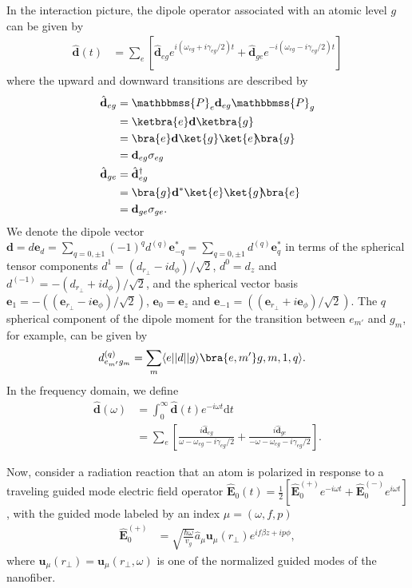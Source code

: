\documentclass[]{report}
\begin{document}
In the interaction picture, the dipole operator associated with an atomic level $ g $ can be given by
\begin{align}\label{eq:dtop}
\hat{\mathbf{d}}(t) &= \sum_e \left[ \hat{\mathbf{d}}_{eg}e^{i(\omega_{eg}+i\gamma_{eg}/2)t} + \hat{\mathbf{d}}_{ge}e^{-i(\omega_{eg}-i\gamma_{eg}/2)t}\right]
\end{align}
where the upward and downward transitions are described by
\begin{align}
\hat{\mathbf{d}}_{eg} &= \mathbbmss{P}_e\mathbf{d}_{eg}\mathbbmss{P}_g\\
&= \ketbra{e} \mathbf{d}\ketbra{g}\\
&= \bra{e} \mathbf{d}\ket{g} \ket{e}\!\!\bra{g}\\
&= \mathbf{d}_{eg} \sigma_{eg}\\
\hat{\mathbf{d}}_{ge} &=\hat{\mathbf{d}}_{eg}^\dagger \\
&= \bra{g} \mathbf{d}^*\ket{e} \ket{g}\!\!\bra{e}\\
&= \mathbf{d}_{ge}\sigma_{ge}.
\end{align}
We denote the dipole vector $ \mathbf{d}=d\mathbf{e}_d=\sum_{q=0,\pm 1} (-1)^qd^{(q)}\mathbf{e}^*_{-q}=\sum_{q=0,\pm 1} d^{(q)}\mathbf{e}^*_{q} $ in terms of the spherical tensor components $ d^1=(d_{r\!_\perp}-id_{\phi})/\sqrt{2} $, $ d^0=d_z $ and $ d^{(-1)} =-(d_{r\!_\perp}+id_{\phi})/\sqrt{2} $, and the spherical vector basis $ \mathbf{e}_1=-((\mathbf{e}_{r\!_\perp}-i\mathbf{e}_{\phi})/\sqrt{2}) $, $ \mathbf{e}_0=\mathbf{e}_z $ and $ \mathbf{e}_{-1}=((\mathbf{e}_{r\!_\perp}+i\mathbf{e}_{\phi})/\sqrt{2}) $. The $ q $ spherical component of the dipole moment for the transition between $ e_{m'} $ and $ g_m $, for example, can be given by
\begin{align}
d^{(q)}_{e_{m'}g_{m}}&= \sum_m \langle e||d||g\rangle \bra{e,m'}g,m,1,q\rangle .
\end{align}
In the frequency domain, we define 
\begin{align}
\hat{\mathbf{d}}(\omega) &= \int_0^\infty \hat{\mathbf{d}}(t)e^{-i\omega t}\mathrm{d}t\\
&= \sum_e \left[ \frac{i\hat{\mathbf{d}}_{eg}}{ \omega -\omega_{eg}-i\gamma_{eg}/2 } + \frac{i\hat{\mathbf{d}}_{ge}}{ - \omega-\omega_{eg}-i\gamma_{eg}/2}\right].
\end{align}

Now, consider a radiation reaction that an atom is polarized in response to a traveling guided mode electric field operator $ \hat{\mathbf{E}}_0(t)=\frac{1}{2}\left[\hat{\mathbf{E}}^{(+)}_0e^{-i\omega t} +  \hat{\mathbf{E}}^{(-)}_0e^{i\omega t}\right] $, with the guided mode labeled by an index $ \mu = (\omega,f,p)$
\begin{align}
\hat{\mathbf{E}}^{(+)}_0 &= \sqrt{\frac{\hbar \omega}{v_g}} \hat{a}_\mu \mathbf{u}_{\mu} (r\!_\perp) e^{if\beta z+ip\phi},
\end{align} 
where $ \mathbf{u}_{\mu} (r\!_\perp)=\mathbf{u}_\mu(r\!_\perp,\omega) $  is one of the normalized guided modes of the nanofiber. 
\end{document}
